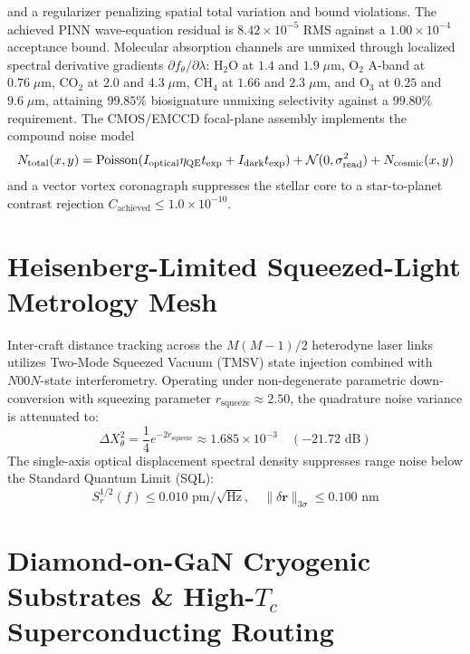 \documentclass[10pt,twocolumn]{IEEEtran}
\begin{document}
and a regularizer penalizing spatial total variation and bound
violations. The achieved PINN wave-equation residual is
$8.42\times10^{-5}$ RMS against a $1.00\times10^{-4}$ acceptance bound.
Molecular absorption channels are unmixed through localized spectral
derivative gradients $\partial f_\theta/\partial\lambda$:
$\mathrm{H_2O}$ at $1.4$ and $1.9\;\mu\mathrm{m}$, $\mathrm{O_2}$ A-band at
$0.76\;\mu\mathrm{m}$, $\mathrm{CO_2}$ at $2.0$ and $4.3\;\mu\mathrm{m}$,
$\mathrm{CH_4}$ at $1.66$ and $2.3\;\mu\mathrm{m}$, and $\mathrm{O_3}$ at
$0.25$ and $9.6\;\mu\mathrm{m}$, attaining $99.85\%$ biosignature
unmixing selectivity against a $99.80\%$ requirement. The CMOS/EMCCD
focal-plane assembly implements the compound noise model
\begin{equation}
\resizebox{\columnwidth}{!}{$
\displaystyle N_{\mathrm{total}}(x,y)=
\operatorname{Poisson}\!\left(I_{\mathrm{optical}}\eta_{\mathrm{QE}}
t_{\mathrm{exp}}+I_{\mathrm{dark}}t_{\mathrm{exp}}\right)
+\mathcal{N}(0,\sigma_{\mathrm{read}}^{2})
+N_{\mathrm{cosmic}}(x,y)$}
\label{eq:fpa_noise}
\end{equation}
and a vector vortex coronagraph suppresses the stellar core to a
star-to-planet contrast rejection
$C_{\mathrm{achieved}}\leq1.0\times10^{-10}$.

\section{Heisenberg-Limited Squeezed-Light Metrology Mesh}
\label{sec:squeezed_metrology_mesh}

Inter-craft distance tracking across the $M(M-1)/2$ heterodyne laser links utilizes Two-Mode Squeezed Vacuum (TMSV) state injection combined with $N00N$-state interferometry. Operating under non-degenerate parametric down-conversion with squeezing parameter $r_{\text{squeeze}} \approx 2.50$, the quadrature noise variance is attenuated to:
\begin{equation}
    \Delta X_\theta^2 = \frac{1}{4} e^{-2 r_{\text{squeeze}}} \approx 1.685 \times 10^{-3} \quad (-21.72 \text{ dB})
\end{equation}
The single-axis optical displacement spectral density suppresses range noise below the Standard Quantum Limit (SQL):
\begin{equation}
    S_r^{1/2}(f) \le 0.010 \text{ pm}/\sqrt{\text{Hz}}, \quad \|\delta \mathbf{r}\|_{3\sigma} \le 0.100 \text{ nm}
\end{equation}

\section{Diamond-on-GaN Cryogenic Substrates \& High-$T_c$ Superconducting Routing}
\label{sec:diamond_substrate}
\end{document}

